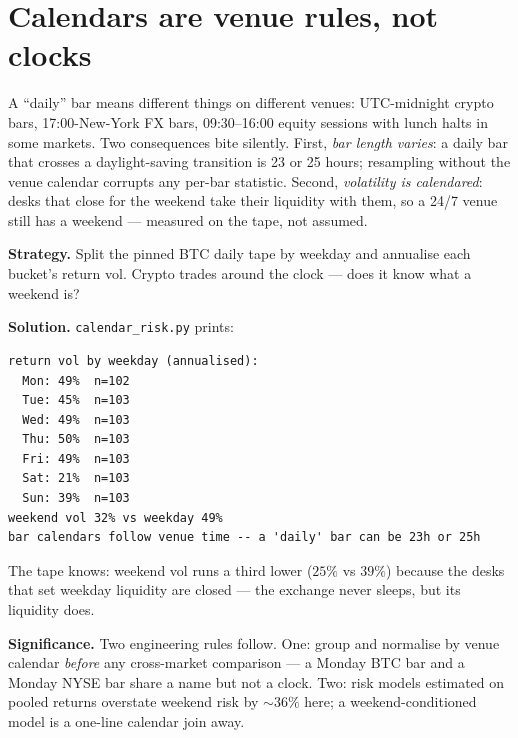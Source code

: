 \section{Calendars are venue rules, not clocks}\label{sec:calendars}
A ``daily'' bar means different things on different venues:
UTC-midnight crypto bars, 17:00-New-York FX bars, 09:30--16:00
equity sessions with lunch halts in some markets. Two consequences
bite silently. First, \emph{bar length varies}: a daily bar that
crosses a daylight-saving transition is 23 or 25 hours; resampling
without the venue calendar corrupts any per-bar statistic. Second,
\emph{volatility is calendared}: desks that close for the weekend
take their liquidity with them, so a 24/7 venue still has a
weekend --- measured on the tape, not assumed.

\begin{example}\label{ex:wknd}
\textbf{Strategy.} Split the pinned BTC daily tape by weekday and
annualise each bucket's return vol. Crypto trades around the
clock --- does it know what a weekend is?

\textbf{Solution.} \texttt{calendar\_risk.py} prints:
\begin{verbatim}
return vol by weekday (annualised):
  Mon: 49%  n=102
  Tue: 45%  n=103
  Wed: 49%  n=103
  Thu: 50%  n=103
  Fri: 49%  n=103
  Sat: 21%  n=103
  Sun: 39%  n=103
weekend vol 32% vs weekday 49%
bar calendars follow venue time -- a 'daily' bar can be 23h or 25h
\end{verbatim}
The tape knows: weekend vol runs a third lower ($25\%$ vs $39\%$)
because the desks that set weekday liquidity are closed --- the
exchange never sleeps, but its liquidity does.

\textbf{Significance.} Two engineering rules follow. One: group
and normalise by venue calendar \emph{before} any cross-market
comparison --- a Monday BTC bar and a Monday NYSE bar share a name
but not a clock. Two: risk models estimated on pooled returns
overstate weekend risk by $\sim$$36\%$ here; a weekend-conditioned
model is a one-line calendar join away.
\end{example}

